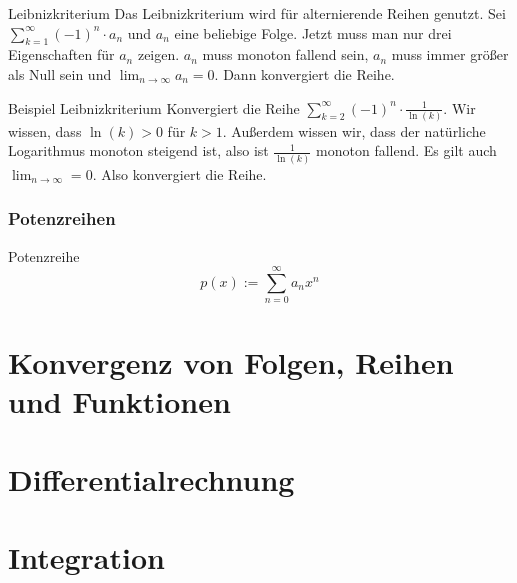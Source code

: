 \documentclass[german]{spicker}
\begin{document}
\begin{algo}{Leibnizkriterium}
    Das Leibnizkriterium wird für alternierende Reihen genutzt.
    Sei $\sum_{k=1}^{\infty} (-1)^n \cdot a_n$ und $a_n$ eine beliebige Folge.
    Jetzt muss man nur drei Eigenschaften für $a_n$ zeigen. $a_n$ muss monoton fallend sein, $a_n$ muss immer größer als Null sein und $\lim_{n\to\infty} a_n =0$.
    Dann konvergiert die Reihe.
\end{algo}

\begin{bonus}{Beispiel Leibnizkriterium}
    Konvergiert die Reihe $\sum_{k=2}^{\infty} (-1)^n \cdot \frac{1}{\ln(k)}$.
    Wir wissen, dass $\ln(k) > 0$ für $k>1$.
    Außerdem wissen wir, dass der natürliche Logarithmus monoton steigend ist, also ist $\frac{1}{\ln(k)}$ monoton fallend.
    Es gilt auch $\lim_{n\to\infty} = 0$. Also konvergiert die Reihe.
\end{bonus}

\subsubsection{Potenzreihen}

\begin{defi}{Potenzreihe}
    \[
        p(x) := \sum_{n=0}^{\infty} a_nx^n
    \]
\end{defi}

\section{Konvergenz von Folgen, Reihen und Funktionen}

\section{Differentialrechnung}

\section{Integration}
\end{document}
